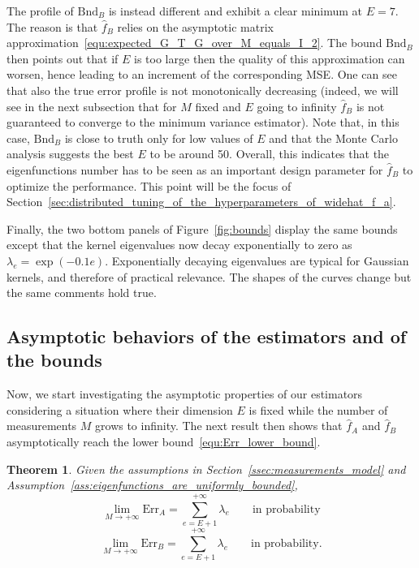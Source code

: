 \documentclass[10pt,twocolumn,twoside]{IEEEtran}					%
\newcounter{generalCounter}
\theoremstyle	{plain}
\newtheorem		{theorem}		[generalCounter]	{Theorem}
\newcommand	{\Assumption}			[0]	{Assumption}
\newcommand	{\Figure}				[0]	{Figure}
\newcommand	{\Section}				[0]	{Section}
\begin{document}
The profile of $\mathrm{Bnd}_{B}$ is instead different and exhibit a clear minimum at $E=7$. The reason is that $\widehat{f}_{B}$ relies on the asymptotic matrix approximation~\eqref{equ:expected_G_T_G_over_M_equals_I_2}. The bound $\mathrm{Bnd}_{B}$ then points out that if $E$ is too large then the quality of this approximation can worsen, hence leading to an increment of the corresponding \ac{MSE}. One can see that also the true error profile is not monotonically decreasing (indeed, we will see in the next subsection that for $M$ fixed and $E$ going to infinity $\widehat{f}_{B}$ is not guaranteed to converge to the minimum variance estimator). Note that, in this case, $\mathrm{Bnd}_{B}$ is close to truth only for low values of $E$ and that the Monte Carlo analysis suggests the best $E$ to be around 50. Overall, this indicates that the eigenfunctions number has to be seen as an important design parameter for $\widehat{f}_{B}$ to optimize the performance. This point will be the focus of \Section~\ref{sec:distributed_tuning_of_the_hyperparameters_of_widehat_f_a}.

Finally, the two bottom panels of \Figure~\ref{fig:bounds} display the same bounds except that the kernel eigenvalues now decay exponentially to zero as $\lambda_e = \exp(-0.1 e)$. Exponentially decaying eigenvalues are typical for Gaussian kernels, and therefore of practical relevance. The shapes of the curves change but the same comments hold true.


\subsection{Asymptotic behaviors of the estimators and of the bounds}
\label{ssec:asymptotic_behaviours_of_the_bounds}

Now, we start investigating the asymptotic properties of our estimators considering a situation where their dimension $E$ is fixed while the number of measurements $M$ grows to infinity. The next result then shows that $\widehat{f}_{A}$ and $\widehat{f}_{B}$ asymptotically reach the lower bound~\eqref{equ:Err_lower_bound}.
%
\begin{theorem}
	Given the assumptions in \Section~\ref{ssec:measurements_model} and \Assumption~\ref{ass:eigenfunctions_are_uniformly_bounded},
	\begin{equation}
		\displaystyle
		\lim_{M \rightarrow + \infty}
		\mathrm{Err}_{A}
		=
		\sum_{e = E + 1}^{+\infty} \lambda_{e}
		\qquad
		\text{in probability}
	\label{equ:f_A_is_asymptotically_efficient}
	\end{equation}
	\begin{equation}
		\displaystyle
		\lim_{M \rightarrow + \infty}
		\mathrm{Err}_{B}
		=
		\sum_{e = E + 1}^{+\infty} \lambda_{e}
		\qquad
		\text{in probability.}
	\label{equ:f_B_is_asymptotically_efficient}
	\end{equation}
	\label{thm:f_A_and_f_B_are_asymptotically_efficient}
\end{theorem}
\end{document}
